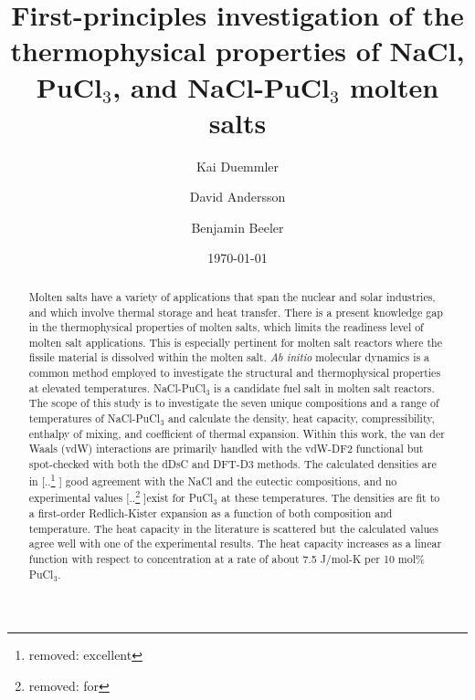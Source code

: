 \documentclass[review]{elsarticle}
\providecommand{\DIFaddtex}[1]{{\protect\color{blue} \sf #1}} %
\providecommand{\DIFdeltex}[1]{{\protect\color{red} [..\footnote{removed: #1} ]}} %
\providecommand{\DIFaddbegin}{} %
\providecommand{\DIFaddend}{} %
\providecommand{\DIFdelbegin}{} %
\providecommand{\DIFdelend}{} %
\providecommand{\DIFadd}[1]{\texorpdfstring{\DIFaddtex{#1}}{#1}} %
\providecommand{\DIFdel}[1]{\texorpdfstring{\DIFdeltex{#1}}{}} %
\newcommand{\DIFscaledelfig}{0.5}
\newlength{\DIFdelgraphicswidth} %
\newlength{\DIFdelgraphicsheight} %
\newcommand{\DIFaddincludegraphics}[2][]{{\color{blue}\fbox{\DIFOincludegraphics[#1]{#2}}}} %
\newcommand{\DIFdelincludegraphics}[2][]{%
\sbox{\DIFdelgraphicsbox}{\DIFOincludegraphics[#1]{#2}}%
\settoboxwidth{\DIFdelgraphicswidth}{\DIFdelgraphicsbox} %
\settoboxtotalheight{\DIFdelgraphicsheight}{\DIFdelgraphicsbox} %
\scalebox{\DIFscaledelfig}{%
\parbox[b]{\DIFdelgraphicswidth}{\usebox{\DIFdelgraphicsbox}\\[-\baselineskip] \rule{\DIFdelgraphicswidth}{0em}}\llap{\resizebox{\DIFdelgraphicswidth}{\DIFdelgraphicsheight}{%
\setlength{\unitlength}{\DIFdelgraphicswidth}%
\begin{picture}(1,1)%
\thicklines\linethickness{2pt} %
{\color[rgb]{1,0,0}\put(0,0){\framebox(1,1){}}}%
{\color[rgb]{1,0,0}\put(0,0){\line( 1,1){1}}}%
{\color[rgb]{1,0,0}\put(0,1){\line(1,-1){1}}}%
\end{picture}%
}\hspace*{3pt}}} %
} %
\DeclareRobustCommand{\DIFaddbegin}{\DIFOaddbegin \let\includegraphics\DIFaddincludegraphics} %
\DeclareRobustCommand{\DIFaddend}{\DIFOaddend \let\includegraphics\DIFOincludegraphics} %
\DeclareRobustCommand{\DIFdelbegin}{\DIFOdelbegin \let\includegraphics\DIFdelincludegraphics} %
\DeclareRobustCommand{\DIFdelend}{\DIFOaddend \let\includegraphics\DIFOincludegraphics} %
\begin{document}
\begin{frontmatter}

\title{First-principles investigation of the thermophysical properties of NaCl, PuCl$_3$, and NaCl-PuCl$_3$ molten salts}

\author[ncsu]{Kai Duemmler}
\author[lanl]{David Andersson}
\author[ncsu,inl]{Benjamin Beeler}

\address[ncsu]{Department of Nuclear Engineering, North Carolina State University, Raleigh, NC 27695}
\address[inl]{Idaho National Laboratory, Idaho Falls, ID 83415}
\address[lanl]{Materials Science and Technology Division, Los Alamos National Laboratory, P.O. Box 1663. Los Alamos, NM, 87545, USA}
\date{\today}

\begin{abstract}
Molten salts have a variety of applications that span the nuclear and solar industries, and which involve thermal storage and heat transfer. There is a present knowledge gap in the thermophysical properties of molten salts, which limits the readiness level of molten salt applications. This is especially pertinent for molten salt reactors where the fissile material is dissolved within the molten salt. \textit{Ab initio} molecular dynamics is a common method employed to investigate the structural and thermophysical properties at elevated temperatures. NaCl-PuCl$_3$ is a candidate fuel salt in molten salt reactors. The scope of this study is to investigate the seven unique compositions and a range of temperatures of NaCl-PuCl$_3$ and calculate the density, heat capacity, compressibility, enthalpy of mixing, and coefficient of thermal expansion. Within this work, the van der Waals (vdW) interactions are primarily handled with the vdW-DF2 functional but spot-checked with both the dDsC and DFT-D3 methods. The calculated densities are in \DIFdelbegin \DIFdel{excellent }\DIFdelend \DIFaddbegin \DIFadd{good }\DIFaddend agreement with the NaCl and the eutectic compositions, and no experimental values \DIFdelbegin \DIFdel{for }\DIFdelend exist for PuCl$_3$ at these temperatures. The densities are fit to a first-order Redlich-Kister expansion as a function of both composition and temperature. The heat capacity in the literature is scattered but the calculated values agree well with one of the experimental results. The heat capacity increases as a linear function with respect to concentration at a rate of about 7.5 J/mol-K per 10 mol\% PuCl$_3$.
\end{abstract}

\end{frontmatter}
\end{document}
